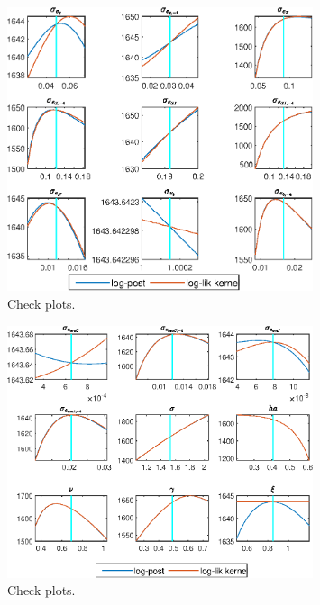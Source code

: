  
\begin{figure}[H]
\centering 
\includegraphics[width=0.80\textwidth]{BRS_sectoral_wo_gmf/graphs/BRS_sectoral_wo_gmf_CheckPlots1}
\caption{Check plots.}\label{Fig:CheckPlots:1}
\end{figure}
 
\begin{figure}[H]
\centering 
\includegraphics[width=0.80\textwidth]{BRS_sectoral_wo_gmf/graphs/BRS_sectoral_wo_gmf_CheckPlots2}
\caption{Check plots.}\label{Fig:CheckPlots:2}
\end{figure}
 
